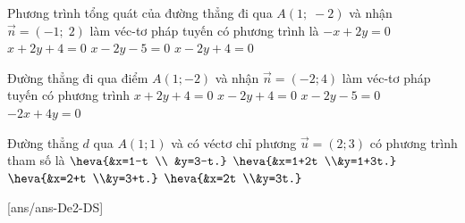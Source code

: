 \begin{ex}%
	Phương trình tổng quát của đường thẳng đi qua $A\left(1;\;-2\right)$ và nhận $\overrightarrow{n}=\left(-1;\; 2\right)$ làm véc-tơ pháp tuyến có phương trình là
	\choice
	{$-x+2y=0$}
	{$x+2y+4=0$}
	{\True $x-2y-5=0$}
	{$x-2y+4=0$}
\end{ex}
\begin{ex}%
	Đường thẳng đi qua điểm $A\left(1;-2\right)$ và nhận $\overrightarrow{n}=\left(-2;4\right)$ làm véc-tơ pháp tuyến có phương trình
	\choice
	{$x+2 y+4=0$}
	{$x-2 y+4=0$}
	{\True $x-2 y-5=0$}
	{$-2 x+4 y=0$}
\end{ex}
\begin{ex}%
	Đường thẳng $d$ qua $A(1; 1)$ và có véctơ chỉ phương $\overrightarrow{u}=(2; 3)$ có phương trình tham số là
	\def\dotEX{}
	\choice
	{$\heva{&x=1-t \\	&y=3-t.}$}
	{\True $\heva{&x=1+2t \\&y=1+3t.}$}
	{$\heva{&x=2+t \\&y=3+t.}$}
	{$\heva{&x=2t \\&y=3t.}$}
\end{ex}
\cauds
{}[ans/ans-De2-DS]
